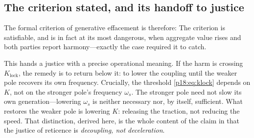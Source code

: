 \subsection{The criterion stated, and its handoff to justice}
\label{p18:sub:crit-handoff}

The formal criterion of generative effacement is therefore:  The criterion is satisfiable, and is in fact at its most dangerous, when aggregate value rises and both parties report harmony---exactly the case  required it to catch.

This hands  a justice with a precise operational meaning. If the harm is crossing $K_{\text{lock}}$, the remedy is to return below it: to lower the coupling until the weaker pole recovers its own frequency. Crucially, the threshold \eqref{p18:eq:klock} depends on $K$, not on the stronger pole's frequency $\omega_s$. The stronger pole need not slow its own generation---lowering $\omega_s$ is neither necessary nor, by itself, sufficient. What restores the weaker pole is lowering $K$: releasing the traction, not reducing the speed. That distinction, derived here, is the whole content of the claim in  that the justice of reticence is \emph{decoupling, not deceleration}.
